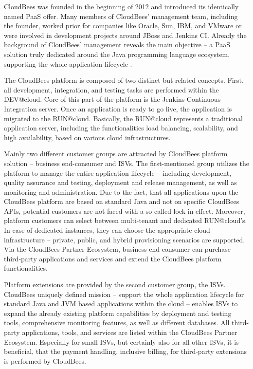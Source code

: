 CloudBees was founded in the beginning of 2012 and introduced its identically named \ac{PaaS} offer. Many members of CloudBees' management team, including the founder, worked prior for companies like Oracle, Sun, IBM, and VMware or were involved in development projects around JBoss and Jenkins CI. Already the background of CloudBees' management reveals the main objective -- a \ac{PaaS} solution truly dedicated around the Java programming language ecosystem, supporting the whole application lifecycle \citep{CloudBees2013}.

The CloudBees platform is composed of two distinct but related concepts. First, all development, integration, and testing tasks are performed within the DEV@cloud. Core of this part of the platform is the Jenkins Continuous Integration server. Once an application is ready to go live, the application is migrated to the RUN@cloud. Basically, the RUN@cloud represents a traditional application server, including the functionalities load balancing, scalability, and high availability, based on various cloud infrastructures.

Mainly two different customer groups are attracted by CloudBees platform solution -- business end-consumer and \acp{ISV}. The first-mentioned group utilizes the platform to manage the entire application lifecycle -- including development, quality assurance and testing, deployment and release management, as well as monitoring and administration. Due to the fact, that all applications upon the CloudBees platform are based on standard Java and not on specific CloudBees \acp{API}, potential customers are not faced with a so called lock-in effect. Moreover, platform customers can select between multi-tenant and dedicated RUN@cloud's. In case of dedicated instances, they can choose the appropriate cloud infrastructure -- private, public, and hybrid provisioning scenarios are supported. Via the CloudBees Partner Ecosystem, business end-consumer can purchase third-party applications and services and extend the CloudBees platform functionalities. 

Platform extensions are provided by the second customer group, the \acp{ISV}. CloudBees uniquely defined mission -- support the whole application lifecycle for standard Java and \ac{JVM} based applications within the cloud -- enables \acp{ISV} to expand the already existing platform capabilities by deployment and testing tools, comprehensive monitoring features, as well as different databases. All third-party applications, tools, and services are listed within the CloudBees Partner Ecosystem. Especially for small \acp{ISV}, but certainly also for all other \acp{ISV}, it is beneficial, that the payment handling, inclusive billing, for third-party extensions is performed by CloudBees.

